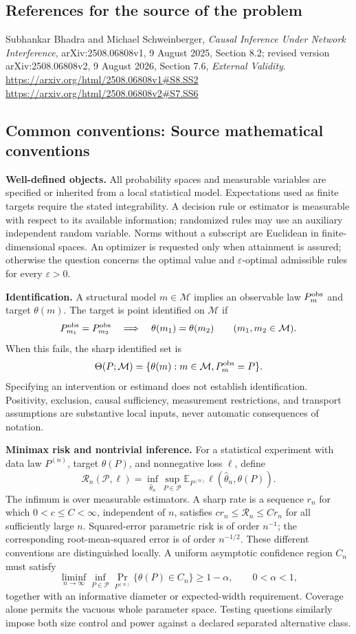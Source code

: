 \documentclass[11pt,a4paper]{article}
\newcommand{\E}{\mathbb E}
\begin{document}
\subsection*{References for the source of the problem}
Subhankar Bhadra and Michael Schweinberger, \emph{Causal Inference Under Network Interference}, arXiv:2508.06808v1, 9 August 2025, Section 8.2; revised version arXiv:2508.06808v2, 9 August 2026, Section 7.6, \emph{External Validity}.
\url{https://arxiv.org/html/2508.06808v1#S8.SS2}
\url{https://arxiv.org/html/2508.06808v2#S7.SS6}

\subsection*{Common conventions: Source mathematical conventions}

\textbf{Well-defined objects.}
All probability spaces and measurable variables are specified or inherited
from a local statistical model. Expectations used as finite targets require
the stated integrability. A decision rule or estimator is measurable with
respect to its available information; randomized rules may use an auxiliary
independent random variable. Norms without a subscript are Euclidean in
finite-dimensional spaces. An optimizer is requested only when attainment
is assured; otherwise the question concerns the optimal value and
$\varepsilon$-optimal admissible rules for every $\varepsilon>0$.

\textbf{Identification.}
A structural model $m\in\mathcal M$ implies an observable law
$P_m^{\rm obs}$ and target $\theta(m)$. The target is point identified on
$\mathcal M$ if
\[
 P_{m_1}^{\rm obs}=P_{m_2}^{\rm obs}
 \quad\Longrightarrow\quad\theta(m_1)=\theta(m_2)
 \qquad(m_1,m_2\in\mathcal M).
\]
When this fails, the sharp identified set is
\[
 \Theta(P;\mathcal M)=\{\theta(m):m\in\mathcal M,
                                  P_m^{\rm obs}=P\}.
\]
Specifying an intervention or estimand does not establish identification.
Positivity, exclusion, causal sufficiency, measurement restrictions, and
transport assumptions are substantive local inputs, never automatic
consequences of notation.

\textbf{Minimax risk and nontrivial inference.}
For a statistical experiment with data law $P^{(n)}$, target $\theta(P)$,
and nonnegative loss $\ell$, define
\[
 \mathcal R_n(\mathcal P,\ell)
   =\inf_{\widehat\theta_n}\sup_{P\in\mathcal P}
      \E_{P^{(n)}}\ell(\widehat\theta_n,\theta(P)).
\]
The infimum is over measurable estimators. A sharp rate is a sequence
$r_n$ for which $0<c\leq C<\infty$, independent of $n$, satisfies
$c r_n\leq\mathcal R_n\leq C r_n$ for all sufficiently large $n$.
Squared-error parametric risk is of order $n^{-1}$; the corresponding
root-mean-squared error is of order $n^{-1/2}$. These different conventions
are distinguished locally. A uniform asymptotic confidence region $C_n$
must satisfy
\[
 \liminf_{n\to\infty}\inf_{P\in\mathcal P}
     \Pr_{P^{(n)}}\{\theta(P)\in C_n\}\geq 1-\alpha,
 \qquad 0<\alpha<1,
\]
together with an informative diameter or expected-width requirement.
Coverage alone permits the vacuous whole parameter space. Testing questions
similarly impose both size control and power against a declared separated
alternative class.
\end{document}
